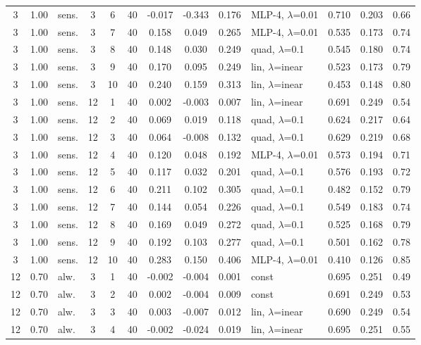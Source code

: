 \documentclass[10pt]{article}
\begin{document}
\begin{scriptsize}
\begin{longtable}{cclcc c ccc l ccc}
3 & 1.00 & sens. & 3 & 6 & 40 & -0.017 & -0.343 & 0.176 & MLP-4, $\lambda$=0.01 & 0.710 & 0.203 & 0.66 \\
3 & 1.00 & sens. & 3 & 7 & 40 & 0.158 & 0.049 & 0.265 & MLP-4, $\lambda$=0.01 & 0.535 & 0.173 & 0.74 \\
3 & 1.00 & sens. & 3 & 8 & 40 & 0.148 & 0.030 & 0.249 & quad, $\lambda$=0.1 & 0.545 & 0.180 & 0.74 \\
3 & 1.00 & sens. & 3 & 9 & 40 & 0.170 & 0.095 & 0.249 & lin, $\lambda$=inear & 0.523 & 0.173 & 0.79 \\
3 & 1.00 & sens. & 3 & 10 & 40 & 0.240 & 0.159 & 0.313 & lin, $\lambda$=inear & 0.453 & 0.148 & 0.80 \\
3 & 1.00 & sens. & 12 & 1 & 40 & 0.002 & -0.003 & 0.007 & lin, $\lambda$=inear & 0.691 & 0.249 & 0.54 \\
3 & 1.00 & sens. & 12 & 2 & 40 & 0.069 & 0.019 & 0.118 & quad, $\lambda$=0.1 & 0.624 & 0.217 & 0.64 \\
3 & 1.00 & sens. & 12 & 3 & 40 & 0.064 & -0.008 & 0.132 & quad, $\lambda$=0.1 & 0.629 & 0.219 & 0.68 \\
3 & 1.00 & sens. & 12 & 4 & 40 & 0.120 & 0.048 & 0.192 & MLP-4, $\lambda$=0.01 & 0.573 & 0.194 & 0.71 \\
3 & 1.00 & sens. & 12 & 5 & 40 & 0.117 & 0.032 & 0.201 & quad, $\lambda$=0.1 & 0.576 & 0.193 & 0.72 \\
3 & 1.00 & sens. & 12 & 6 & 40 & 0.211 & 0.102 & 0.305 & quad, $\lambda$=0.1 & 0.482 & 0.152 & 0.79 \\
3 & 1.00 & sens. & 12 & 7 & 40 & 0.144 & 0.054 & 0.226 & quad, $\lambda$=0.1 & 0.549 & 0.183 & 0.74 \\
3 & 1.00 & sens. & 12 & 8 & 40 & 0.169 & 0.049 & 0.272 & quad, $\lambda$=0.1 & 0.525 & 0.168 & 0.79 \\
3 & 1.00 & sens. & 12 & 9 & 40 & 0.192 & 0.103 & 0.277 & quad, $\lambda$=0.1 & 0.501 & 0.162 & 0.78 \\
3 & 1.00 & sens. & 12 & 10 & 40 & 0.283 & 0.150 & 0.406 & MLP-4, $\lambda$=0.01 & 0.410 & 0.126 & 0.85 \\
12 & 0.70 & alw. & 3 & 1 & 40 & -0.002 & -0.004 & 0.001 & const & 0.695 & 0.251 & 0.49 \\
12 & 0.70 & alw. & 3 & 2 & 40 & 0.002 & -0.004 & 0.009 & const & 0.691 & 0.249 & 0.53 \\
12 & 0.70 & alw. & 3 & 3 & 40 & 0.003 & -0.007 & 0.012 & lin, $\lambda$=inear & 0.690 & 0.249 & 0.54 \\
12 & 0.70 & alw. & 3 & 4 & 40 & -0.002 & -0.024 & 0.019 & lin, $\lambda$=inear & 0.695 & 0.251 & 0.55 \\

\end{longtable}
\end{scriptsize}
\end{document}

